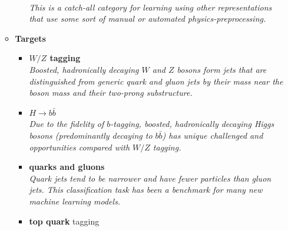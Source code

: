 \documentclass[12pt,letterpaper]{article}
\begin{document}
\begin{itemize}
\begin{itemize}
\begin{itemize}
				\\\textit{This is a catch-all category for learning using other representations that use some sort of manual or automated physics-preprocessing.}
			\end{itemize}
		\item \textbf{Targets}
			\begin{itemize}
			\item \textbf{$W/Z$ tagging}~\cite{Ma:2024qoa,Bose:2024pwc,Bogatskiy:2023nnw,Baron:2023yhw,Grossi:2023fqq,Athanasakos:2023fhq,Aguilar-Saavedra:2023pde,Subba:2022czw,Kim:2021gtv,Dreyer:2020brq,1811770,Chen:2019uar,Sirunyan:2020lcu,Louppe:2017ipp,Barnard:2016qma,deOliveira:2015xxd}
			\\\textit{Boosted, hadronically decaying $W$ and $Z$ bosons form jets that are distinguished from generic quark and gluon jets by their mass near the boson mass and their two-prong substructure.}
			\item \textbf{$H\rightarrow b\bar{b}$}~\cite{Tagami:2024gtc,Ma:2024qoa,Khosa:2021cyk,Jang:2021eph,Abbas:2020khd,guo2020boosted,Tannenwald:2020mhq,Chung:2020ysf,Sirunyan:2020lcu,Chakraborty:2019imr,Moreno:2019neq,Lin:2018cin,Datta:2019ndh}
			\\\textit{Due to the fidelity of $b$-tagging, boosted, hadronically decaying Higgs bosons (predominantly decaying to $b\bar{b}$) has unique challenged and opportunities compared with $W/Z$ tagging.}
			\item \textbf{quarks and gluons}~\cite{Geuskens:2024tfo,Brehmer:2024yqw,Tagami:2024gtc,Wu:2024thh,Sandoval:2024ldp,Blekman:2024wyf,Dolan:2023abg,Shen:2023ofd,He:2023cfc,Athanasakos:2023fhq,CrispimRomao:2023ssj,Bright-Thonney:2022xkx,Dreyer:2021hhr,Filipek:2021qbe,Romero:2021qlf,Dreyer:2020brq,Lee:2019cad,Lee:2019ssx,1806025,Kasieczka:2018lwf,Moreno:2019bmu,Chien:2018dfn,Stoye:DLPS2017,Cheng:2017rdo,Komiske:2016rsd,ATL-PHYS-PUB-2017-017}
			\\\textit{Quark jets tend to be narrower and have fewer particles than gluon jets.  This classification task has been a benchmark for many new machine learning models.}
			\item \textbf{top quark} tagging~\cite{Brehmer:2024yqw,Larkoski:2024hfe,Kvita:2024ooa,Sahu:2024fzi,Dong:2024xsg,Cai:2024xnt,Ngairangbam:2023cps,Furuichi:2023vdx,Batson:2023ohn,Liu:2023dio,Bogatskiy:2023fug,Baron:2023yhw,Sahu:2023uwb,Isildak:2023dnf,Shen:2023ofd,Bogatskiy:2023nnw,He:2023cfc,Keicher:2023mer,Choi:2023slq,Bhattacherjee:2022gjq,Munoz:2022gjq,Ahmed:2022hct,Dreyer:2022yom,Andrews:2021ejw,Aguilar-Saavedra:2021rjk,Dreyer:2020brq,Lim:2020igi,Bhattacharya:2020vzu,Macaluso:2018tck,Kasieczka:2017nvn,Butter:2017cot,Diefenbacher:2019ezd,Chakraborty:2020yfc,Kasieczka:2019dbj,Stoye:DLPS2017,Almeida:2015jua}

\end{itemize}
\end{itemize}
\end{itemize}
\end{document}
